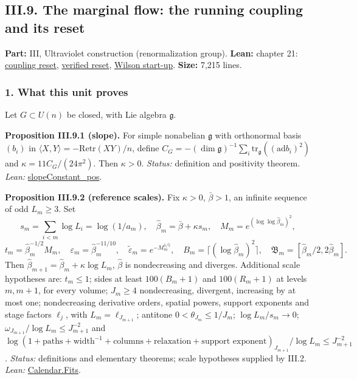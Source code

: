 \documentclass[
  letterpaper,
  11pt]{article}
\begin{document}
\subsection{III.9. The marginal flow: the running coupling and its
reset}\label{iii.9.-the-marginal-flow-the-running-coupling-and-its-reset}

\textbf{Part:} III, Ultraviolet construction (renormalization group).
\textbf{Lean:} chapter 21:
\href{https://github.com/yang-mills-group/OpenAI-YM-20261028/tree/3456e5e75cf8d4cd558955a5c7638fba2d68f464/YM/UVNext/COUPLING_RESET}{coupling
reset},
\href{https://github.com/yang-mills-group/OpenAI-YM-20261028/tree/3456e5e75cf8d4cd558955a5c7638fba2d68f464/YM/AnalyticBridge/VERIFIED_RESET_STEP}{verified
reset},
\href{https://github.com/yang-mills-group/OpenAI-YM-20261028/tree/3456e5e75cf8d4cd558955a5c7638fba2d68f464/YM/Extra/WILSON_STARTUP}{Wilson
start-up}. \textbf{Size:} 7,215 lines.

\subsubsection{1. What this unit proves}\label{what-this-unit-proves-11}

Let \(G\subset U(n)\) be closed, with Lie algebra \(\mathfrak g\).

\textbf{Proposition III.9.1 (slope).} For simple nonabelian
\(\mathfrak g\) with orthonormal basis \((b_i)\) in
\(\langle X,Y\rangle=-\mathrm{Re}\mathrm{tr}(XY)/n\), define
\(C_G=-(\dim\mathfrak g)^{-1}\sum_i\mathrm{tr}_{\mathfrak g}((\mathrm{ad}b_i)^2)\)
and \(\kappa=11C_G/(24\pi^2)\). Then \(\kappa>0\). \emph{Status:}
definition and positivity theorem. \emph{Lean:}
\href{https://github.com/yang-mills-group/OpenAI-YM-20261028/blob/3456e5e75cf8d4cd558955a5c7638fba2d68f464/YM/Gauge/Casimir.lean\#L174-L176}{slopeConstant\_pos}.

\textbf{Proposition III.9.2 (reference scales).} Fix \(\kappa>0\),
\(\bar\beta>1\), an infinite sequence of odd \(L_m\ge3\). Set
\[s_m=\sum_{i<m}\log L_i=\log(1/a_m),\quad \hat\beta_m=\bar\beta+\kappa s_m,\quad M_m=e^{(\log\log\hat\beta_m)^2},\]
\[t_m=\hat\beta_m^{-1/2}M_m,\quad\varepsilon_m=\hat\beta_m^{-11/10},\quad\tilde\varepsilon_m=e^{-M_m^{1/5}},\quad B_m=\lceil(\log\hat\beta_m)^2\rceil,\quad\mathfrak B_m=[\hat\beta_m/2,2\hat\beta_m].\]
Then \(\hat\beta_{m+1}=\hat\beta_m+\kappa\log L_m\), \(\hat\beta\) is
nondecreasing and diverges. Additional scale hypotheses are:
\(t_m\le1\); sides at least \(100(B_m+1)\) and \(100(R_m+1)\) at levels
\(m,m+1\), for every volume; \(J_m\ge4\) nondecreasing, divergent,
increasing by at most one; nondecreasing derivative orders, spatial
powers, support exponents and stage factors \(\ell_j\), with
\(L_m=\ell_{J_{m+1}}\); antitone \(0<\theta_{J_m}\le1/J_m\);
\(\log L_m/s_m\to0\); \(\omega_{J_{m+1}}/\log L_m\le J_{m+1}^{-2}\) and
\(\log(1+\text{paths}+\text{width}^{-1}+\text{columns}+\text{relaxation}+\text{support exponent})_{J_{m+1}}/\log L_m\le J_{m+1}^{-2}\).
\emph{Status:} definitions and elementary theorems; scale hypotheses
supplied by III.2. \emph{Lean:}
\href{https://github.com/yang-mills-group/OpenAI-YM-20261028/blob/3456e5e75cf8d4cd558955a5c7638fba2d68f464/YM/RG/History.lean\#L97-L118}{Calendar.Fits}.
\end{document}
